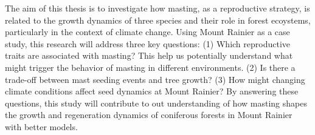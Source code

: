 \documentclass[11pt,letter]{article}
\begin{document}
The aim of this thesis is to investigate how masting, as a reproductive strategy, is related to the growth dynamics of three species and their role in forest ecoystems, particularly in the context of climate change. Using Mount Rainier as a case study, this research will address three key questions: (1) Which reproductive traits are associated with masting? This help us potentially understand what might trigger the behavior of masting in different environments. (2) Is there a trade-off between mast seeding events and tree growth? (3) How might changing climate conditions affect seed dynamics at Mount Rainier? By answering these questions, this study will contribute to out understanding of how masting shapes the growth and regeneration dynamics of coniferous forests in  Mount Rainier with better models.\par
\end{document}
